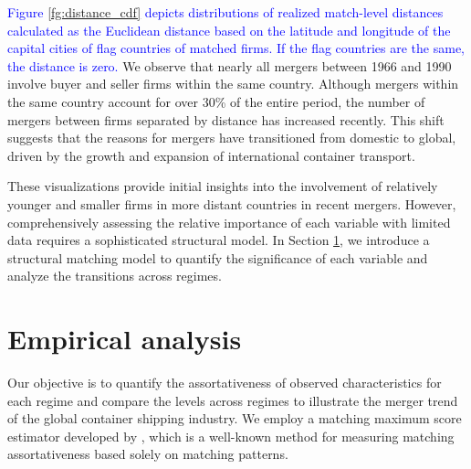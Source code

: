 \documentclass[10pt]{article}
\begin{document}
\textcolor{blue}{Figure \ref{fg:distance_cdf} depicts distributions of realized match-level distances calculated as the Euclidean distance based on the latitude and longitude of the capital cities of flag countries of matched firms. If the flag countries are the same, the distance is zero.}
We observe that nearly all mergers between 1966 and 1990 involve buyer and seller firms within the same country. 
Although mergers within the same country account for over 30\% of the entire period, the number of mergers between firms separated by distance has increased recently. 
This shift suggests that the reasons for mergers have transitioned from domestic to global, driven by the growth and expansion of international container transport.

These visualizations provide initial insights into the involvement of relatively younger and smaller firms in more distant countries in recent mergers. 
However, comprehensively assessing the relative importance of each variable with limited data requires a sophisticated structural model. 
In Section \ref{sec:empirical_analysis}, we introduce a structural matching model to quantify the significance of each variable and analyze the transitions across regimes.




\section{Empirical analysis}\label{sec:empirical_analysis}

Our objective is to quantify the assortativeness of observed characteristics for each regime and compare the levels across regimes to illustrate the merger trend of the global container shipping industry. 
We employ a matching maximum score estimator developed by \cite{fox2018qe}, which is a well-known method for measuring matching assortativeness based solely on matching patterns.
\end{document}
